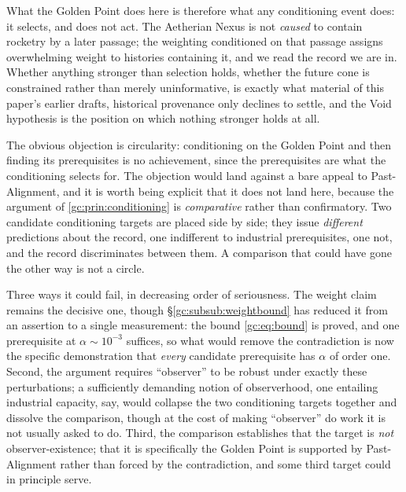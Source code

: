 \begin{remark}
What the Golden Point does here is therefore what any conditioning event
does: it selects, and does not act. The Aetherian Nexus is not
\emph{caused} to contain rocketry by a later passage; the weighting
conditioned on that passage assigns overwhelming weight to histories
containing it, and we read the record we are in. Whether anything
stronger than selection holds, whether the future cone is constrained
rather than merely uninformative, is exactly what
material of this paper's earlier drafts, historical provenance only declines to settle, and the Void hypothesis
is the position on which nothing stronger holds at all.
\end{remark}

\begin{remark}
\label{gc:rem:circularity}
The obvious objection is circularity: conditioning on the Golden Point
and then finding its prerequisites is no achievement, since the
prerequisites are what the conditioning selects for. The objection would
land against a bare appeal to Past-Alignment, and it is worth being
explicit that it does not land here, because the argument of
\ref{gc:prin:conditioning} is \emph{comparative} rather than
confirmatory. Two candidate conditioning targets are placed side by
side; they issue \emph{different} predictions about the record, one
indifferent to industrial prerequisites, one not, and the record
discriminates between them. A comparison that could have gone the other
way is not a circle.

Three ways it could fail, in decreasing order of seriousness. The weight claim remains the decisive one, though
\S\ref{gc:subsub:weightbound} has reduced it from an assertion to a
single measurement: the bound \eqref{gc:eq:bound} is proved, and one
prerequisite at $\alpha\sim10^{-3}$ suffices, so what would remove the
contradiction is now the specific demonstration that \emph{every}
candidate prerequisite has $\alpha$ of order one. Second, the
argument requires ``observer'' to be robust under exactly these
perturbations; a sufficiently demanding notion of observerhood, one
entailing industrial capacity, say, would collapse the two
conditioning targets together and dissolve the comparison, though at the
cost of making ``observer'' do work it is not usually asked to do.
Third, the comparison establishes that the target is \emph{not}
observer-existence; that it is specifically the Golden Point is
supported by Past-Alignment rather than forced by the contradiction, and
some third target could in principle serve.
\end{remark}


